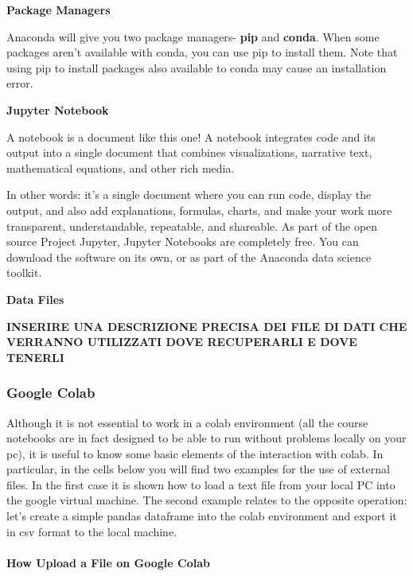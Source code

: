 \documentclass[11pt]{article}
\begin{document}
    \textbf{Package Managers}

Anaconda will give you two package managers- \textbf{pip} and
\textbf{conda}. When some packages aren't available with conda, you can
use pip to install them. Note that using pip to install packages also
available to conda may cause an installation error.

    \textbf{Jupyter Notebook}

A notebook is a document like this one! A notebook integrates code and
its output into a single document that combines visualizations,
narrative text, mathematical equations, and other rich media.

In other words: it's a single document where you can run code, display
the output, and also add explanations, formulas, charts, and make your
work more transparent, understandable, repeatable, and shareable. As
part of the open source Project Jupyter, Jupyter Notebooks are
completely free. You can download the software on its own, or as part of
the Anaconda data science toolkit.

    \textbf{Data Files}

\textbf{INSERIRE UNA DESCRIZIONE PRECISA DEI FILE DI DATI CHE VERRANNO
UTILIZZATI DOVE RECUPERARLI E DOVE TENERLI}

    \hypertarget{google-colab}{%
\subsubsection{Google Colab}\label{google-colab}}

    Although it is not essential to work in a colab environment (all the
course notebooks are in fact designed to be able to run without problems
locally on your pc), it is useful to know some basic elements of the
interaction with colab. In particular, in the cells below you will find
two examples for the use of external files. In the first case it is
shown how to load a text file from your local PC into the google virtual
machine. The second example relates to the opposite operation: let's
create a simple pandas dataframe into the colab environment and export
it in csv format to the local machine.

    \hypertarget{how-upload-a-file-on-google-colab}{%
\paragraph{How Upload a File on Google
Colab}\label{how-upload-a-file-on-google-colab}}
\end{document}
